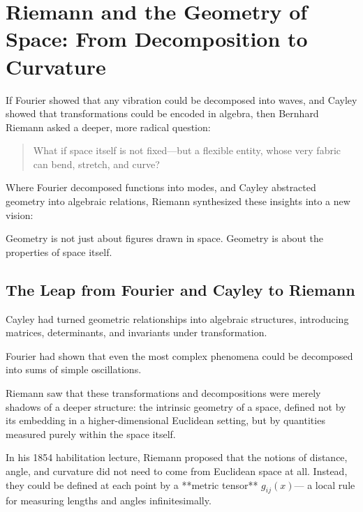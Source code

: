\section{Riemann and the Geometry of Space: From Decomposition to Curvature}

If Fourier showed that any vibration could be decomposed into waves,  
and Cayley showed that transformations could be encoded in algebra,  
then Bernhard Riemann asked a deeper, more radical question:

\begin{quote}
What if space itself is not fixed—but a flexible entity, whose very fabric can bend, stretch, and curve?
\end{quote}

Where Fourier decomposed functions into modes,  
and Cayley abstracted geometry into algebraic relations,  
Riemann synthesized these insights into a new vision:

Geometry is not just about figures drawn in space. Geometry is about the properties of space itself.

\subsection{The Leap from Fourier and Cayley to Riemann}

Cayley had turned geometric relationships into algebraic structures,  
introducing matrices, determinants, and invariants under transformation.

Fourier had shown that even the most complex phenomena could be decomposed into sums of simple oscillations.

Riemann saw that these transformations and decompositions were merely shadows of a deeper structure:  
the intrinsic geometry of a space, defined not by its embedding in a higher-dimensional Euclidean setting,  
but by quantities measured purely within the space itself.

In his 1854 habilitation lecture, Riemann proposed that the notions of distance, angle, and curvature  
did not need to come from Euclidean space at all.  
Instead, they could be defined at each point by a **metric tensor** \( g_{ij}(x) \)—  
a local rule for measuring lengths and angles infinitesimally.


